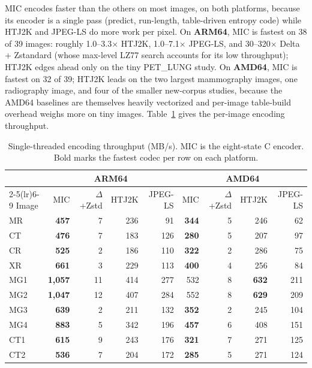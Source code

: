 \documentclass[journal]{IEEEtran}
\begin{document}
MIC encodes faster than the others on most images, on both platforms,
because its encoder is a single pass (predict, run-length, table-driven
entropy code) while HTJ2K and JPEG-LS do more work per pixel. On
\textbf{ARM64}, MIC is fastest on 38 of 39 images: roughly 1.0--3.3$\times$
HTJ2K, 1.0--7.1$\times$ JPEG-LS, and 30--320$\times$ Delta + Zstandard (whose
max-level LZ77 search accounts for its low throughput); HTJ2K edges ahead only
on the tiny PET\_LUNG study. On \textbf{AMD64}, MIC is fastest on 32 of 39;
HTJ2K leads on the two largest mammography images, one radiography image, and
four of the smaller new-corpus studies, because the AMD64 baselines are
themselves heavily vectorized and per-image table-build overhead weighs more on
tiny images.
Table~\ref{tab:enc} gives the per-image encoding throughput.

\begin{table}[htbp]
\centering
\caption{Single-threaded encoding throughput (MB/s). MIC is the
eight-state C encoder. Bold marks the fastest codec per row on each
platform.}
\label{tab:enc}
\scriptsize
\begin{tabular}{l|rrrr|rrrr}
\toprule
 & \multicolumn{4}{c|}{ARM64} & \multicolumn{4}{c}{AMD64} \\
\cmidrule(lr){2-5}\cmidrule(lr){6-9}
Image & MIC & $\Delta$+Zstd & HTJ2K & JPEG-LS & MIC & $\Delta$+Zstd & HTJ2K & JPEG-LS \\
\midrule
MR             & \textbf{457} & 7 & 236 & 91 & \textbf{344} & 5 & 246 & 62 \\
CT             & \textbf{476} & 7 & 183 & 126 & \textbf{280} & 5 & 207 & 97 \\
CR             & \textbf{525} & 2 & 186 & 110 & \textbf{322} & 2 & 286 & 75 \\
XR             & \textbf{661} & 3 & 229 & 113 & \textbf{400} & 4 & 256 & 84 \\
MG1            & \textbf{1{,}057} & 11 & 414 & 277 & 532 & 8 & \textbf{632} & 211 \\
MG2            & \textbf{1{,}047} & 12 & 407 & 284 & 552 & 8 & \textbf{629} & 209 \\
MG3            & \textbf{639} & 2 & 211 & 132 & \textbf{352} & 2 & 245 & 104 \\
MG4            & \textbf{883} & 5 & 342 & 196 & \textbf{457} & 6 & 408 & 151 \\
CT1            & \textbf{615} & 9 & 243 & 176 & \textbf{321} & 7 & 271 & 125 \\
CT2            & \textbf{536} & 7 & 204 & 172 & \textbf{285} & 5 & 271 & 124 \\

\end{tabular}
\end{table}
\end{document}
